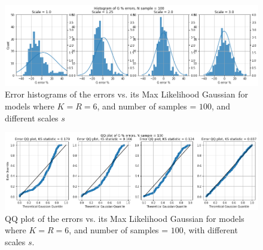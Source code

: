 \begin{figure}[!htb]
\begin{center}
    \centering
    \includegraphics[width=1.0\textwidth]{Chap6_EvaluationAndAnalysis/distribution_variation/hist_KR6_gaussian.png}    
\caption{Error histograms of the errors vs. its Max Likelihood Gaussian for models where \(K=R=6\), and number of samples = \(100\), and different scales \(s\)}
\label{fig:hist_KR6_gaussian}
\end{center}
\end{figure}

\begin{figure}[!htb]
\begin{center}
    \centering
    \includegraphics[width=1.0\textwidth]{Chap6_EvaluationAndAnalysis/distribution_variation/QQ_KR6_gaussian.png}
\caption{QQ plot of the errors vs. its Max Likelihood Gaussian for models where \(K=R=6\), and number of samples = \(100\), with different scales \(s\).}
\label{fig:QQ_KR6_gaussian}
\end{center}
\end{figure}

